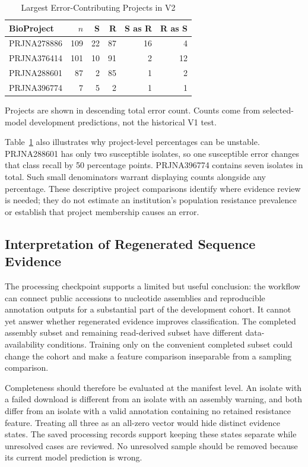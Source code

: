\begin{table}[t]
\caption{Largest Error-Contributing Projects in V2}
\label{tab:projects}
\centering\footnotesize
\begin{tabular}{lrrrrr}\toprule
BioProject & $n$ & S & R & S as R & R as S\\\midrule
PRJNA278886&109&22&87&16&4\\
PRJNA376414&101&10&91&2&12\\
PRJNA288601&87&2&85&1&2\\
PRJNA396774&7&5&2&1&1\\\bottomrule
\end{tabular}
\vspace{3pt}
\parbox{\columnwidth}{\footnotesize Projects are shown in descending total error count. Counts come from selected-model development predictions, not the historical V1 test.}
\end{table}

Table~\ref{tab:projects} also illustrates why project-level percentages can be unstable. PRJNA288601 has only two susceptible isolates, so one susceptible error changes that class recall by 50 percentage points. PRJNA396774 contains seven isolates in total. Such small denominators warrant displaying counts alongside any percentage. These descriptive project comparisons identify where evidence review is needed; they do not estimate an institution's population resistance prevalence or establish that project membership causes an error.

\subsection{Interpretation of Regenerated Sequence Evidence}
The processing checkpoint supports a limited but useful conclusion: the workflow can connect public accessions to nucleotide assemblies and reproducible annotation outputs for a substantial part of the development cohort. It cannot yet answer whether regenerated evidence improves classification. The completed assembly subset and remaining read-derived subset have different data-availability conditions. Training only on the convenient completed subset could change the cohort and make a feature comparison inseparable from a sampling comparison.

Completeness should therefore be evaluated at the manifest level. An isolate with a failed download is different from an isolate with an assembly warning, and both differ from an isolate with a valid annotation containing no retained resistance feature. Treating all three as an all-zero vector would hide distinct evidence states. The saved processing records support keeping these states separate while unresolved cases are reviewed. No unresolved sample should be removed because its current model prediction is wrong.

